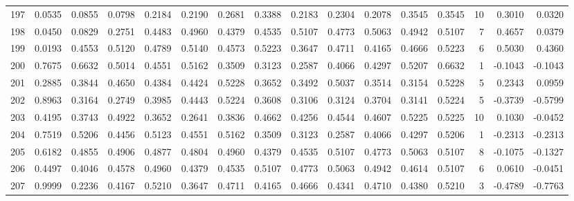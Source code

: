 \begin{tabular}{lrrrrrrrrrrrrrrr}
197 &      0.0535 &  0.0855 &  0.0798 &  0.2184 &  0.2190 &  0.2681 &  0.3388 &  0.2183 &  0.2304 &  0.2078 &   0.3545 &     0.3545 &     10 &                    0.3010 &                     0.0320 \\
198 &      0.0450 &  0.0829 &  0.2751 &  0.4483 &  0.4960 &  0.4379 &  0.4535 &  0.5107 &  0.4773 &  0.5063 &   0.4942 &     0.5107 &      7 &                    0.4657 &                     0.0379 \\
199 &      0.0193 &  0.4553 &  0.5120 &  0.4789 &  0.5140 &  0.4573 &  0.5223 &  0.3647 &  0.4711 &  0.4165 &   0.4666 &     0.5223 &      6 &                    0.5030 &                     0.4360 \\
200 &      0.7675 &  0.6632 &  0.5014 &  0.4551 &  0.5162 &  0.3509 &  0.3123 &  0.2587 &  0.4066 &  0.4297 &   0.5207 &     0.6632 &      1 &                   -0.1043 &                    -0.1043 \\
201 &      0.2885 &  0.3844 &  0.4650 &  0.4384 &  0.4424 &  0.5228 &  0.3652 &  0.3492 &  0.5037 &  0.3514 &   0.3154 &     0.5228 &      5 &                    0.2343 &                     0.0959 \\
202 &      0.8963 &  0.3164 &  0.2749 &  0.3985 &  0.4443 &  0.5224 &  0.3608 &  0.3106 &  0.3124 &  0.3704 &   0.3141 &     0.5224 &      5 &                   -0.3739 &                    -0.5799 \\
203 &      0.4195 &  0.3743 &  0.4922 &  0.3652 &  0.2641 &  0.3836 &  0.4662 &  0.4256 &  0.4544 &  0.4607 &   0.5225 &     0.5225 &     10 &                    0.1030 &                    -0.0452 \\
204 &      0.7519 &  0.5206 &  0.4456 &  0.5123 &  0.4551 &  0.5162 &  0.3509 &  0.3123 &  0.2587 &  0.4066 &   0.4297 &     0.5206 &      1 &                   -0.2313 &                    -0.2313 \\
205 &      0.6182 &  0.4855 &  0.4906 &  0.4877 &  0.4804 &  0.4960 &  0.4379 &  0.4535 &  0.5107 &  0.4773 &   0.5063 &     0.5107 &      8 &                   -0.1075 &                    -0.1327 \\
206 &      0.4497 &  0.4046 &  0.4578 &  0.4960 &  0.4379 &  0.4535 &  0.5107 &  0.4773 &  0.5063 &  0.4942 &   0.4614 &     0.5107 &      6 &                    0.0610 &                    -0.0451 \\
207 &      0.9999 &  0.2236 &  0.4167 &  0.5210 &  0.3647 &  0.4711 &  0.4165 &  0.4666 &  0.4341 &  0.4710 &   0.4380 &     0.5210 &      3 &                   -0.4789 &                    -0.7763 \\

\end{tabular}

